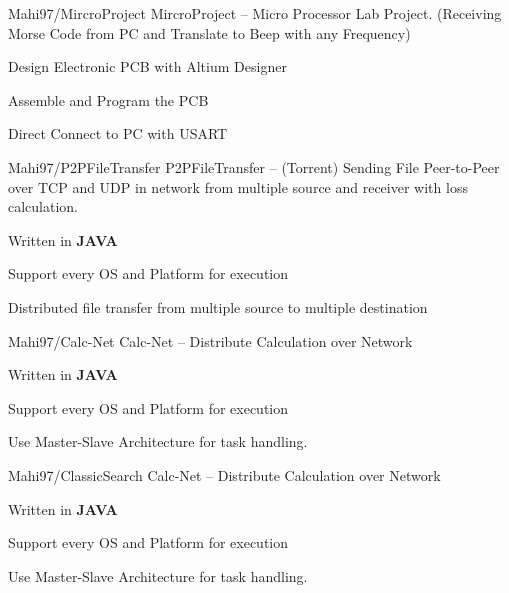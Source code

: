 \begin{cventries}
    \cventry
    {Mahi97/MircroProject} %
    {MircroProject -- Micro Processor Lab Project. (Receiving Morse Code from PC and Translate to Beep with any Frequency)} %
    {} %
    {} %
    {
      \begin{cvitems} %
        \item {Design Electronic PCB with Altium Designer}
        \item {Assemble and Program the PCB}
        \item {Direct Connect to PC with USART}
      \end{cvitems}
    }

    \cventry
    {Mahi97/P2PFileTransfer} %
    {P2PFileTransfer -- (Torrent) Sending File Peer-to-Peer over TCP and UDP in network from multiple source and receiver with loss calculation.} %
    {} %
    {} %
    {
      \begin{cvitems} %
        \item {Written in \textbf{JAVA}}
        \item {Support every OS and Platform for execution}
        \item {Distributed file transfer from multiple source to multiple destination}
      \end{cvitems}
    }

    
    \cventry
    {Mahi97/Calc-Net} %
    {Calc-Net -- Distribute Calculation over Network} %
    {} %
    {} %
    {
      \begin{cvitems} %
         \item {Written in \textbf{JAVA}}
        \item {Support every OS and Platform for execution}
        \item {Use Master-Slave Architecture for task handling.}
      \end{cvitems}
    }

    
    \cventry
    {Mahi97/ClassicSearch} %
    {Calc-Net -- Distribute Calculation over Network} %
    {} %
    {} %
    {
      \begin{cvitems} %
         \item {Written in \textbf{JAVA}}
        \item {Support every OS and Platform for execution}
        \item {Use Master-Slave Architecture for task handling.}
      \end{cvitems}
    }
    

\end{cventries}
